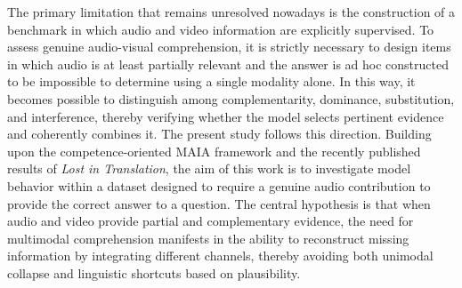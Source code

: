 The primary limitation that remains unresolved nowadays is the construction of a benchmark in which audio and video information are explicitly supervised. To assess genuine audio-visual comprehension, it is strictly necessary to design items in which audio is at least partially relevant and the answer is ad hoc constructed to be impossible to determine using a single modality alone. In this way, it becomes possible to distinguish among complementarity, dominance, substitution, and interference, thereby verifying whether the model selects pertinent evidence and coherently combines it.
The present study follows this direction. Building upon the competence-oriented \acs{MAIA} framework and the recently published results of \textit{Lost in Translation}, the aim of this work is to investigate model behavior within a dataset designed to require a genuine audio contribution to provide the correct answer to a question.
The central hypothesis is that when audio and video provide partial and complementary evidence, the need for multimodal comprehension manifests in the ability to reconstruct missing information by integrating different channels, thereby avoiding both unimodal collapse and linguistic shortcuts based on plausibility.